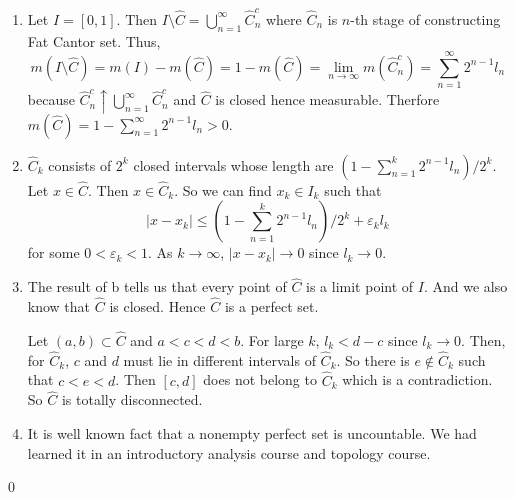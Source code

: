 \begin{exercise}[1.4] \hfill
	\begin{enumerate}[label = (\alph*)]
		\item Let $I = \left[ 0, 1 \right]$.
			Then $I\setminus \hat{C} = \bigcup_{n=1}^\infty \hat{C}_n^c$
			where $\hat{C}_n$ is $n$-th stage of constructing Fat Cantor set.
			Thus,
			\[
				m(I\setminus \hat{C}) = m(I) - m(\hat{C}) = 1- m(\hat{C}) =\lim_{n\rightarrow \infty}m(\hat{C}_n^c) = \sum_{n=1}^\infty 2^{n-1}l_n
			\]
			because $\hat{C}_n^c \uparrow \bigcup_{n=1}^\infty \hat{C}_n^c$ and $\hat{C}$ is closed hence measurable.
			Therfore $m(\hat{C})  = 1-\sum_{n=1}^\infty 2^{n-1}l_n >0$.

		\item $\hat{C}_k$ consists of $2^k$ closed intervals whose length are $(1-\sum_{n=1}^k 2^{n-1}l_n)/2^k$.
			Let $x \in \hat{C}$. Then $x\in \hat{C}_k$.
			So we can find $x_k \in I_k$ such that
		\[
			|x-x_k| \leq \left( 1-\sum_{n=1}^k 2^{n-1}l_n \right)/2^k + \varepsilon_k l_k
		\]
		for some $0 < \varepsilon_k < 1$.
		As $k\rightarrow \infty$, $|x-x_k| \rightarrow 0$ since $l_k \rightarrow 0$.

	\item The result of b tells us that every point of $\hat{C}$ is a limit point of $I$.
		And we also know that $\hat{C}$ is closed.
		Hence $\hat{C}$ is a perfect set.

		Let $(a, b) \subset \hat{C}$ and $a < c < d < b$.
		For large $k$, $l_k < d-c$ since $l_k \rightarrow 0$.
		Then, for $\hat{C}_k$, $c$ and $d$ must lie in different intervals of $\hat{C}_k$.
		So there is $e \notin \hat{C}_k$ such that $c<e<d$.
		Then $\left[ c, d \right]$ does not belong to $\hat{C}_k$ which is a contradiction.
		So $\hat{C}$ is totally disconnected.
		
	\item It is well known fact that a nonempty perfect set is uncountable.
		We had learned it in an introductory analysis course and topology course.
	\end{enumerate}
\qed

\end{exercise}

